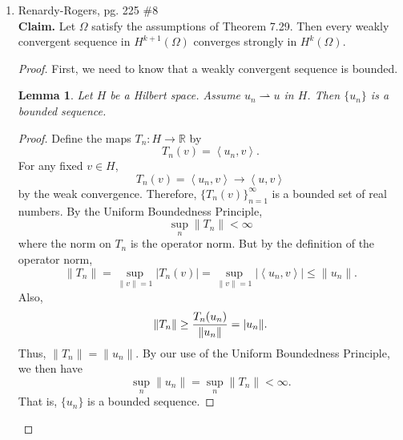 \documentclass[a4paper]{article}
\newtheorem{lemma}{Lemma}[section]
\newenvironment{claim}{\textbf{Claim.}}{}
\newcommand{\R}{\mathbb{R}}
\newcommand{\la}{\left \langle}
\newcommand{\ra}{\right \rangle}
\begin{document}
\begin{enumerate}
    \begin{proof}
      Take $u,v \in H^1(\R)$. By Theorem 7.18 in Renardy-Rogers (Sobolev Embedding), there is a constant C with
      \[ \|u\|_{L^\infty} \leq C \|u\|_{H^1} \]
      and
      \[ \|v\|_{L^\infty} \leq C \|v\|_{H^1} .\]
      Then we have
      \begin{align*}
        \|uv\|_{H^1}^2 &= \int_{\R}^{} |uv|^2 + |(uv)'|^2 dx \\
        &\leq \int_{\R}^{} |uv|^2 + |u' v|^2 + |u v'|^2 dx \\
        &= \int_{\R}^{} u^2 (v^2 + (v')^2) + (u')^2 v^2 dx \\
        &\leq \int_{\R}^{} u^2 (v^2 + (v')^2) + v^2 (u^2 + (u')^2) dx \\
        &\leq \|u\|_{L^\infty}^2 \int_{\R}^{} v^2 + (v')^2 dx + \|v\|_{L^\infty}^2 \int_{\R}^{} u^2 + (u')^2 dx \\
        &\leq C \|u\|_{H^1}^2 \|v\|_{H^1}^2 + C \|u\|_{H^1}^2 \|v\|_{H^1}^2 \\
        &< \infty
      \end{align*}

      Therefore $uv \in H^1(\R)$.
    \end{proof}

  \item Renardy-Rogers, pg. 225 \#8 \\
    \begin{claim}
      Let $\Omega$ satisfy the assumptions of Theorem 7.29. Then every weakly convergent sequence in $H^{k+1}(\Omega)$ converges strongly in
      $H^k(\Omega)$.
    \end{claim}

    \begin{proof}
      First, we need to know that a weakly convergent sequence is bounded.
      \begin{lemma} \label{weak_bdd}
        Let $H$ be a Hilbert space. Assume $u_n \rightharpoonup u$ in $H$. Then $\{u_n\}$ is a bounded sequence.
      \end{lemma}
      \begin{proof}
        Define the maps $T_n:H \to \R$ by
        \[ T_n(v) = \la u_n, v \ra .\]
        For any fixed $v \in H$,
        \[ T_n(v) = \la u_n, v \ra \to \la u, v \ra \]
        by the weak convergence. Therefore, $\{ T_n(v) \}_{n=1}^\infty$ is a bounded set of real numbers.
        By the Uniform Boundedness Principle,
        \[ \sup_n \|T_n\| < \infty \]
        where the norm on $T_n$ is the operator norm.
        But by the definition of the operator norm,
        \[ \|T_n\| = \sup_{\|v\|=1} |T_n(v)| = \sup_{\|v\|=1} |\la u_n, v \ra| \leq \|u_n\| .\]
        Also,
        \[ \|T_n\| \geq \frac{T_n(u_n)}{\|u_n\|} = \\|u_n\| .\]
        Thus, $\|T_n\| = \|u_n\|$. By our use of the Uniform Boundedness Principle, we then have
        \[ \sup_n \|u_n\| = \sup_n\|T_n\| < \infty .\]
        That is, $\{u_n\}$ is a bounded sequence.
      \end{proof}


\end{proof}
\end{enumerate}
\end{document}
